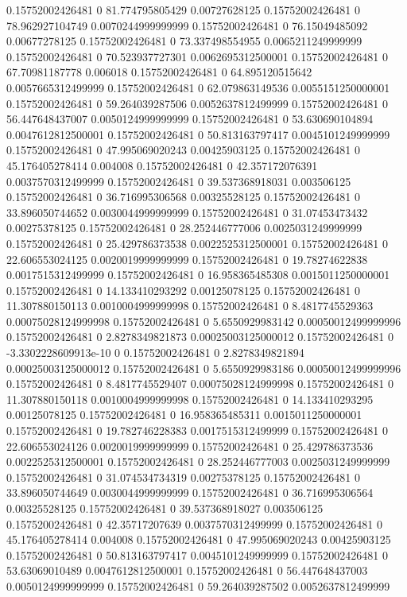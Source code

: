 0.15752002426481 0 81.774795805429 0.00727628125
0.15752002426481 0 78.962927104749 0.0070244999999999
0.15752002426481 0 76.15049485092 0.00677278125
0.15752002426481 0 73.337498554955 0.0065211249999999
0.15752002426481 0 70.523937727301 0.0062695312500001
0.15752002426481 0 67.70981187778 0.006018
0.15752002426481 0 64.895120515642 0.0057665312499999
0.15752002426481 0 62.079863149536 0.0055151250000001
0.15752002426481 0 59.264039287506 0.0052637812499999
0.15752002426481 0 56.447648437007 0.0050124999999999
0.15752002426481 0 53.630690104894 0.0047612812500001
0.15752002426481 0 50.813163797417 0.0045101249999999
0.15752002426481 0 47.995069020243 0.00425903125
0.15752002426481 0 45.176405278414 0.004008
0.15752002426481 0 42.357172076391 0.0037570312499999
0.15752002426481 0 39.537368918031 0.003506125
0.15752002426481 0 36.716995306568 0.00325528125
0.15752002426481 0 33.896050744652 0.0030044999999999
0.15752002426481 0 31.07453473432 0.00275378125
0.15752002426481 0 28.252446777006 0.0025031249999999
0.15752002426481 0 25.429786373538 0.0022525312500001
0.15752002426481 0 22.606553024125 0.0020019999999999
0.15752002426481 0 19.78274622838 0.0017515312499999
0.15752002426481 0 16.958365485308 0.0015011250000001
0.15752002426481 0 14.133410293292 0.00125078125
0.15752002426481 0 11.307880150113 0.0010004999999998
0.15752002426481 0 8.4817745529363 0.00075028124999998
0.15752002426481 0 5.6550929983142 0.00050012499999996
0.15752002426481 0 2.8278349821873 0.00025003125000012
0.15752002426481 0 -3.3302228609913e-10 0
0.15752002426481 0 2.8278349821894 0.00025003125000012
0.15752002426481 0 5.6550929983186 0.00050012499999996
0.15752002426481 0 8.4817745529407 0.00075028124999998
0.15752002426481 0 11.307880150118 0.0010004999999998
0.15752002426481 0 14.133410293295 0.00125078125
0.15752002426481 0 16.958365485311 0.0015011250000001
0.15752002426481 0 19.782746228383 0.0017515312499999
0.15752002426481 0 22.606553024126 0.0020019999999999
0.15752002426481 0 25.429786373536 0.0022525312500001
0.15752002426481 0 28.252446777003 0.0025031249999999
0.15752002426481 0 31.074534734319 0.00275378125
0.15752002426481 0 33.896050744649 0.0030044999999999
0.15752002426481 0 36.716995306564 0.00325528125
0.15752002426481 0 39.537368918027 0.003506125
0.15752002426481 0 42.35717207639 0.0037570312499999
0.15752002426481 0 45.176405278414 0.004008
0.15752002426481 0 47.995069020243 0.00425903125
0.15752002426481 0 50.813163797417 0.0045101249999999
0.15752002426481 0 53.63069010489 0.0047612812500001
0.15752002426481 0 56.447648437003 0.0050124999999999
0.15752002426481 0 59.264039287502 0.0052637812499999
